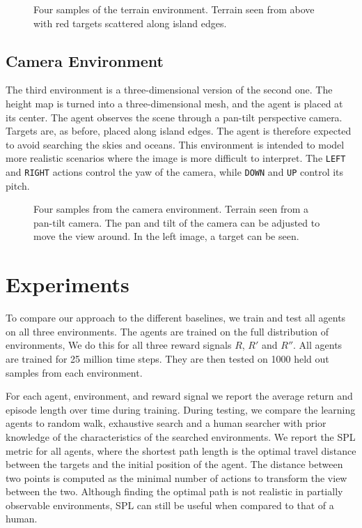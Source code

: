 \begin{figure}
    \centering
    
    \label{fig:terrain}
    \caption[Terrain environment]{Four samples of the terrain environment. Terrain seen from above with red targets scattered along island edges.}
\end{figure}

\subsection{Camera Environment}

The third environment is a three-dimensional version of the second one.
The height map is turned into a three-dimensional mesh, and the agent is placed at its center.
The agent observes the scene through a pan-tilt perspective camera.
Targets are, as before, placed along island edges.
The agent is therefore expected to avoid searching the skies and oceans.
This environment is intended to model more realistic scenarios where the image is more difficult to interpret.
The \texttt{LEFT} and \texttt{RIGHT} actions control the yaw of the camera, while \texttt{DOWN} and \texttt{UP} control its pitch.

\begin{figure}
    \centering
    
    \label{fig:camera}
    \caption[Camera environment]{Four samples from the camera environment. Terrain seen from a pan-tilt camera. The pan and tilt of the camera can be adjusted to move the view around. In the left image, a target can be seen.}
\end{figure}

\section{Experiments}
\label{sec:experiments}


To compare our approach to the different baselines,
we train and test all agents on all three environments.
The agents are trained on the full distribution of environments,
We do this for all three reward signals \(R\), \(R'\) and \(R''\).
All agents are trained for 25 million time steps.
They are then tested on 1000 held out samples from each environment.

For each agent, environment, and reward signal we report the average return and episode length over time during training.
During testing, we compare the learning agents to random walk, exhaustive search and a human searcher with prior knowledge of the characteristics of the searched environments.
We report the SPL metric for all agents, where the shortest path length is the optimal travel distance between the targets and the initial position of the agent.
The distance between two points is computed as the minimal number of actions to transform the view between the two.
Although finding the optimal path is not realistic in partially observable environments, SPL can still be useful when compared to that of a human.


